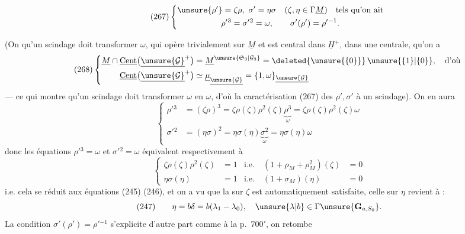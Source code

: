 
\[
\tag{267}
\left\{
\begin{gathered}
\unsure{\rho'}=\zeta\rho,\ \sigma'=\eta\sigma
\quad(\zeta,\eta\in\Gamma\underline M)\quad\text{tels qu'on ait}
\\
\rho'{}^3=\sigma'{}^2=\omega,\qquad
\sigma'(\rho')=\rho'{}^{-1}.
\end{gathered}\right.
\]

(On  qu'un scindage doit transformer $\omega$,
qui opère trivialement sur $\underline M$ et est central
dans $\underline H^+$, dans une 
 centrale, 
   qu'on a
\[
\tag{268}
\left\{\begin{aligned}
\underline M\cap\underline{\mathrm{Cent}}\bigl(\underline{\unsure{\mathcal G}}^+\bigr)
&=\underline M^{\unsure{\mathfrak S_3|\mathcal G_3}}
=\deleted{\unsure{\{0\}}}\,\unsure{\{1\}|\{0\}},\quad\text{d'où}
\\
\underline{\mathrm{Cent}}\bigl(\underline{\unsure{\mathcal G}}^+\bigr)
&\simeq\underline\mu_{\underline{\unsure{\mathcal G}}}
=\{1,\omega\}_{\underline{\unsure{\mathcal G}}}
\end{aligned}\right.
\]
--- ce qui montre qu'un scindage doit transformer $\omega$ en $\omega$,
d'où  la caractérisation (267) des $\rho',\sigma'$
 à un scindage).
On en aura
\[
\left\{\begin{aligned}
\rho'{}^3&=(\zeta\rho)^3
=\zeta\rho(\zeta)\rho^2(\zeta)\underbrace{\rho^3}_{\omega}
=\zeta\rho(\zeta)\rho^2(\zeta)\omega
\\
\sigma'{}^2&=(\eta\sigma)^2
=\eta\sigma(\eta)\underbrace{\sigma^2}_{\omega}
=\eta\sigma(\eta)\omega
\end{aligned}\right.
\]
donc les  équations $\rho'{}^3=\omega$ et
$\sigma'{}^2=\omega$ équivalent respectivement à
\[
\left\{\begin{aligned}
\zeta\rho(\zeta)\rho^2(\zeta)&=1
&\text{i.e.}\quad(1+\rho_M+\rho_M^2)(\zeta)&=0
\\
\eta\sigma(\eta)&=1
&\text{i.e.}\quad(1+\sigma_M)(\eta)&=0
\end{aligned}\right.
\]
i.e. cela se réduit aux équations (245) (246),
et on a vu que la 
sur $\zeta$ est automatiquement satisfaite, celle
sur $\eta$ revient à :
\[
(247)\qquad
\eta=b\delta=b(\lambda_1-\lambda_0),\quad
\unsure{\lambda|b}\in\Gamma\unsure{\mathbf G_{a,S_0}}.
\]
La condition $\sigma'(\rho')=\rho'{}^{-1}$ s'explicite d'autre
part comme à la p.~$700'$, on retombe

